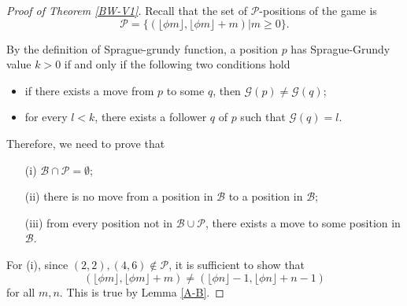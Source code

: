 \documentclass[12pt]{amsart}
\theoremstyle{plain}
\theoremstyle{definition}
\theoremstyle{remark}
\begin{document}
\smallskip
\begin{proof}[Proof of Theorem \ref{BW-V1}]
Recall that the set of ${\mathcal{P}}$-positions of the game is
\[{\mathcal{P}} = \{(\lfloor \phi m \rfloor, \lfloor \phi m \rfloor + m)| m \geq 0\}.\]

By the definition of Sprague-grundy function, a position $p$ has Sprague-Grundy value $k > 0$ if and only if the following two conditions hold
\begin{itemize}
\item if there exists a move from $p$ to some $q$, then ${\mathcal{G}}(p) \neq {\mathcal{G}}(q)$;
\item for every $l < k$, there exists a follower $q$ of $p$ such that ${\mathcal{G}}(q) = l$.
\end{itemize}
Therefore, we need to prove that
\begin{itemize}
\item [(i)] ${\mathcal{B}} \cap {\mathcal{P}} = \emptyset$;
\item [(ii)] there is no move from a position in ${\mathcal{B}}$ to a position in ${\mathcal{B}}$;
\item [(iii)] from every position not in ${\mathcal{B}} \cup{\mathcal{P}}$, there exists a move to some position in ${\mathcal{B}}$.
\end{itemize}

For (i), since $(2,2), (4,6) \notin {\mathcal{P}}$, it is sufficient to show that
\[(\lfloor \phi m \rfloor, \lfloor \phi m \rfloor + m) \neq (\lfloor \phi n \rfloor - 1, \lfloor \phi n \rfloor +n-1)\] for all $m,n$.  This is true by Lemma \ref{A-B}.


\end{proof}
\end{document}
